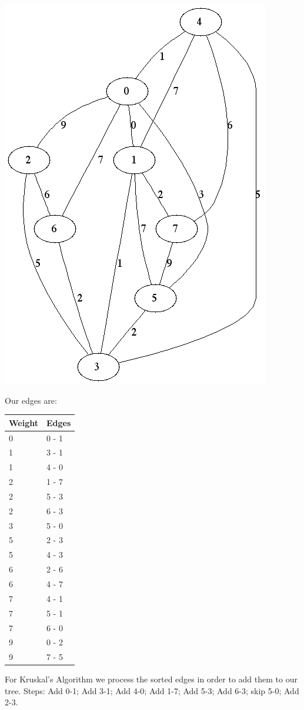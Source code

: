 \documentclass[12pt]{chmullighw}
\begin{document}
\begin{enumerate}
\begin{minipage}{0.65\linewidth}
\includegraphics[width=0.6\linewidth]{q6.png}
\end{minipage}
\begin{minipage}{0.2\linewidth}
Our edges are: \\
\begin{tabular}{l | l}
Weight & Edges \\
\hline
0 & 0 - 1 \\
1 & 3 - 1 \\
1 & 4 - 0 \\
2 & 1 - 7 \\
2 & 5 - 3 \\
2 & 6 - 3 \\
3 & 5 - 0 \\
5 & 2 - 3 \\
5 & 4 - 3 \\
6 & 2 - 6 \\
6 & 4 - 7 \\
7 & 4 - 1 \\
7 & 5 - 1 \\
7 & 6 - 0 \\
9 & 0 - 2 \\
9 & 7 - 5 \\
\end{tabular}
\end{minipage}

For Kruskal's Algorithm we process the sorted edges in order to add them to our
tree. Steps: Add 0-1; Add 3-1; Add 4-0; Add 1-7; Add 5-3; Add 6-3; skip 5-0; Add 2-3.



\end{enumerate}
\end{document}
